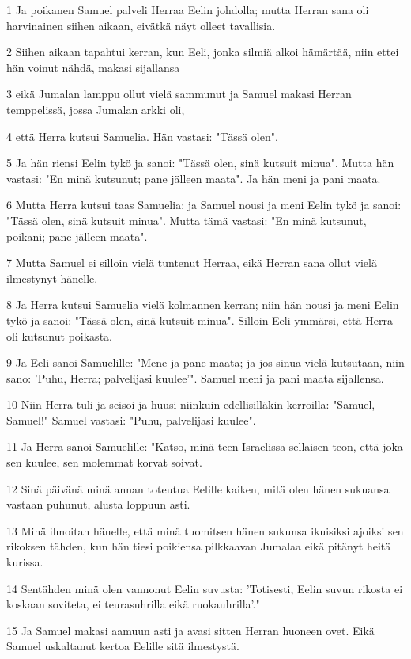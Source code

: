 \par 1 Ja poikanen Samuel palveli Herraa Eelin johdolla; mutta Herran sana oli harvinainen siihen aikaan, eivätkä näyt olleet tavallisia.
\par 2 Siihen aikaan tapahtui kerran, kun Eeli, jonka silmiä alkoi hämärtää, niin ettei hän voinut nähdä, makasi sijallansa
\par 3 eikä Jumalan lamppu ollut vielä sammunut ja Samuel makasi Herran temppelissä, jossa Jumalan arkki oli,
\par 4 että Herra kutsui Samuelia. Hän vastasi: "Tässä olen".
\par 5 Ja hän riensi Eelin tykö ja sanoi: "Tässä olen, sinä kutsuit minua". Mutta hän vastasi: "En minä kutsunut; pane jälleen maata". Ja hän meni ja pani maata.
\par 6 Mutta Herra kutsui taas Samuelia; ja Samuel nousi ja meni Eelin tykö ja sanoi: "Tässä olen, sinä kutsuit minua". Mutta tämä vastasi: "En minä kutsunut, poikani; pane jälleen maata".
\par 7 Mutta Samuel ei silloin vielä tuntenut Herraa, eikä Herran sana ollut vielä ilmestynyt hänelle.
\par 8 Ja Herra kutsui Samuelia vielä kolmannen kerran; niin hän nousi ja meni Eelin tykö ja sanoi: "Tässä olen, sinä kutsuit minua". Silloin Eeli ymmärsi, että Herra oli kutsunut poikasta.
\par 9 Ja Eeli sanoi Samuelille: "Mene ja pane maata; ja jos sinua vielä kutsutaan, niin sano: 'Puhu, Herra; palvelijasi kuulee'". Samuel meni ja pani maata sijallensa.
\par 10 Niin Herra tuli ja seisoi ja huusi niinkuin edellisilläkin kerroilla: "Samuel, Samuel!" Samuel vastasi: "Puhu, palvelijasi kuulee".
\par 11 Ja Herra sanoi Samuelille: "Katso, minä teen Israelissa sellaisen teon, että joka sen kuulee, sen molemmat korvat soivat.
\par 12 Sinä päivänä minä annan toteutua Eelille kaiken, mitä olen hänen sukuansa vastaan puhunut, alusta loppuun asti.
\par 13 Minä ilmoitan hänelle, että minä tuomitsen hänen sukunsa ikuisiksi ajoiksi sen rikoksen tähden, kun hän tiesi poikiensa pilkkaavan Jumalaa eikä pitänyt heitä kurissa.
\par 14 Sentähden minä olen vannonut Eelin suvusta: 'Totisesti, Eelin suvun rikosta ei koskaan soviteta, ei teurasuhrilla eikä ruokauhrilla'."
\par 15 Ja Samuel makasi aamuun asti ja avasi sitten Herran huoneen ovet. Eikä Samuel uskaltanut kertoa Eelille sitä ilmestystä.
